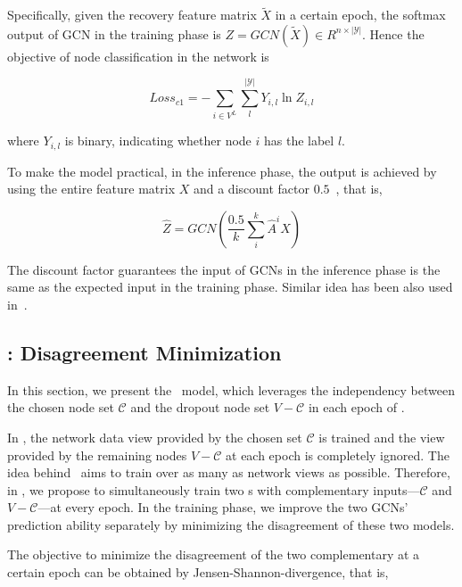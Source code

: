 {{Specifically, given the recovery feature matrix $\widetilde{X}$ in a certain epoch, the softmax output of GCN in the training phase is $Z = GCN(\widetilde{X}) \in R^{n \times |\mathcal{Y}|}$. Hence the  objective of node classification in the network is


\begin{equation}
\label{equ:loss}
	Loss_{c1} = -\sum_{i\in V^L } \sum_l^{|\mathcal{Y}|}Y_{i,l} \ln Z_{i,l}
\end{equation}

\noindent where $Y_{i,l}$ is binary, indicating whether node $i$ has the label $l$.  


To make the model practical, in the inference phase, the output is achieved by using the entire feature matrix $X$ and a discount factor $0.5$~\cite{srivastava2014dropout}, that is, 

\begin{equation}
\label{equ:inf}
	\hat{Z} = GCN\left(\frac{0.5}{k}\sum_i^k\hat{A}^i X\right)
\end{equation}

The discount factor guarantees the input of GCNs in the inference phase is the same as the expected input in the training phase. Similar idea has been also used in~\cite{srivastava2014dropout}. 









\subsection{\dm: Disagreement Minimization}In this section, we present the \dm\ model, which leverages the independency between the chosen node set $\mathcal{C}$ and the dropout node set $V-\mathcal{C}$ in each epoch of \drop. 


In \drop, the network data view provided by the chosen set $\mathcal{C}$ is trained and the view provided by the remaining nodes $V-\mathcal{C}$ at each epoch is completely ignored. 
The idea behind \drop\ aims to train over as many as network views as possible. 
Therefore, in \dm, we propose to simultaneously train two \drop s with complementary inputs---$\mathcal{C}$ and $V-\mathcal{C}$---at every epoch. 
In the  training phase, we improve the two GCNs' prediction ability separately by minimizing the disagreement of these two models. 




The objective to minimize the disagreement of the two complementary \sdrop at a certain epoch can be obtained by Jensen-Shannon-divergence, that is, 

}}
